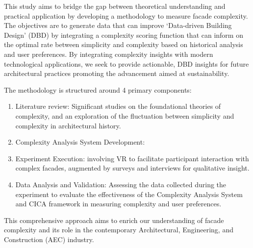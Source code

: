 This study aims to bridge the gap between theoretical understanding and practical application by developing a methodology to measure facade complexity.
The objectives are to generate data that can improve `Data-driven Building Design' (DBD) by integrating a complexity scoring function that can inform on the optimal rate between simplicity and complexity based on historical analysis and user preferences.
By integrating complexity insights with modern technological applications, we seek to provide actionable, DBD insights for future architectural practices promoting the advancement aimed at sustainability.

The methodology is structured around 4 primary components:

\begin{enumerate}
    \item Literature review: Significant studies on the foundational theories of complexity, and an exploration of the fluctuation between simplicity and complexity in architectural history.
    \item Complexity Analysis System Development: 
    \item Experiment Execution: involving VR to facilitate participant interaction with complex facades, augmented by surveys and interviews for qualitative insight.
    \item Data Analysis and Validation: Assessing the data collected during the experiment to evaluate the effectiveness of the Complexity Analysis System and CICA framework in measuring complexity and user preferences.
\end{enumerate}


This comprehensive approach aims to enrich our understanding of facade complexity and its role in the contemporary Architectural, Engineering, and Construction (AEC) industry.





%
